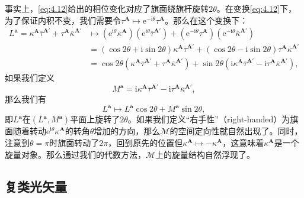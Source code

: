 事实上，\ref{eq:4.12}给出的相位变化对应了旗面绕旗杆旋转$2\theta $。在变换\ref{eq:4.12}下，为了保证内积不变，我们需要令$\tau ^{\boldsymbol{A}} \mapsto \mathrm{e}^{-\mathrm{i} \theta } \tau ^{\boldsymbol{A}}$。那么在这个变换下：
\begin{equation*}
	\begin{aligned}
		L^{\boldsymbol{a}} =\kappa ^{\boldsymbol{A}}\overline{\tau }^{\boldsymbol{A} '} +\tau ^{\boldsymbol{A}}\overline{\kappa }^{\boldsymbol{A} '} & \mapsto (\mathrm{e}^{\mathrm{i} \theta } \kappa ^{\boldsymbol{A}} )(\mathrm{e}^{\mathrm{i} \theta }\overline{\tau }^{\boldsymbol{A} '} )+(\mathrm{e}^{-\mathrm{i} \theta } \tau ^{\boldsymbol{A}} )(\mathrm{e}^{-\mathrm{i} \theta }\overline{\kappa }^{\boldsymbol{A} '} )\\
		& =(\cos 2\theta +\mathrm{i}\sin 2\theta )\kappa ^{\boldsymbol{A}}\overline{\tau }^{\boldsymbol{A} '} +(\cos 2\theta -\mathrm{i}\sin 2\theta )\tau ^{\boldsymbol{A}}\overline{\kappa }^{\boldsymbol{A} '}\\
		& =\cos 2\theta (\kappa ^{\boldsymbol{A}}\overline{\tau }^{\boldsymbol{A} '} +\tau ^{\boldsymbol{A}}\overline{\kappa }^{\boldsymbol{A} '} )+\sin 2\theta (\mathrm{i} \kappa ^{\boldsymbol{A}}\overline{\tau }^{\boldsymbol{A} '} -\mathrm{i} \tau ^{\boldsymbol{A}}\overline{\kappa }^{\boldsymbol{A} '} ),
	\end{aligned}
\end{equation*}
如果我们定义
\begin{equation*}
	M^{\boldsymbol{a}} =\mathrm{i} \kappa ^{\boldsymbol{A}}\overline{\tau }^{\boldsymbol{A} '} -\mathrm{i} \tau ^{\boldsymbol{A}}\overline{\kappa }^{\boldsymbol{A} '} ,
\end{equation*}
那么我们有
\begin{equation*}
	L^{\boldsymbol{a}} \mapsto L^{\boldsymbol{a}}\cos 2\theta +M^{\boldsymbol{a}}\sin 2\theta ,
\end{equation*}
即$L^{\boldsymbol{a}}$在$(L^{\boldsymbol{a}} ,M^{\boldsymbol{a}} )$平面上旋转了$2\theta $。如果我们定义“右手性”（right-handed）为旗面随着转动$\mathrm{e}^{\mathrm{i} \theta } \kappa ^{\boldsymbol{A}}$的转角$\theta $增加的方向，那么$\mathcal{M}$的空间定向性就自然出现了。同时，注意到$\theta =\pi $时旗面转动了$2\pi $，回到原先的位置但$\kappa ^{\boldsymbol{A}} \mapsto -\kappa ^{\boldsymbol{A}}$，这意味着$\kappa ^{\boldsymbol{A}}$是一个旋量对象。那么通过我们的代数方法，$\mathcal{M}$上的旋量结构自然浮现了。


\subsection{复类光矢量}

